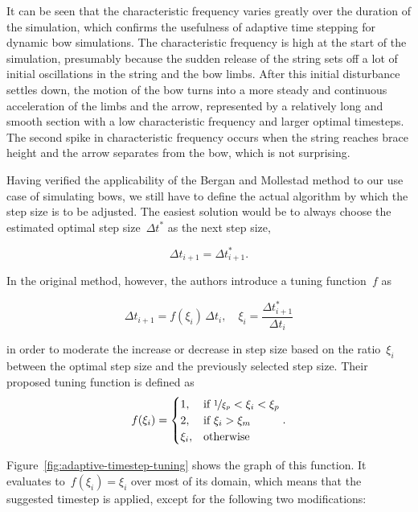 \newpage
It can be seen that the characteristic frequency varies greatly over the duration of the simulation, which confirms the usefulness of adaptive time stepping for dynamic bow simulations.
The characteristic frequency is high at the start of the simulation, presumably because the sudden release of the string sets off a lot of initial oscillations in the string and the bow limbs.
After this initial disturbance settles down, the motion of the bow turns into a more steady and continuous acceleration of the limbs and the arrow, represented by a relatively long and smooth section with a low characteristic frequency and larger optimal timesteps.
The second spike in characteristic frequency occurs when the string reaches brace height and the arrow separates from the bow, which is not surprising.

Having verified the applicability of the Bergan and Mollestad method to our use case of simulating bows, we still have to define the actual algorithm by which the step size is to be adjusted.
The easiest solution would be to always choose the estimated optimal step size~$\Delta t^*$ as the next step size,

\begin{equation}
\Delta t_{i+1} = \Delta t^*_{i+1}.
\end{equation}

In the original method, however, the authors introduce a tuning function~$f$ as

\begin{equation}
\Delta t_{i+1} = f(\xi_{i})\,\Delta t_{i}, \quad \xi_{i} = \frac{\Delta t^*_{i+1}}{\Delta t_{i}}
\end{equation}

in order to moderate the increase or decrease in step size based on the ratio~$\xi_{i}$ between the optimal step size and the previously selected step size.
Their proposed tuning function is defined as
%
\begin{align}
f(\xi_{i}) = \begin{cases}
1, & \text{if~$\nicefrac{1}{\xi_{p}} < \xi_{i} < \xi_{p}$} \\
2, & \text{if~$\xi_{i} > \xi_{m}$} \\
\xi_{i}, & \text{otherwise}
\end{cases}.
\end{align}

Figure~\ref{fig:adaptive-timestep-tuning} shows the graph of this function.
It evaluates to~$f(\xi_{i}) = \xi_{i}$ over most of its domain, which means that the suggested timestep is applied, except for the following two modifications:


